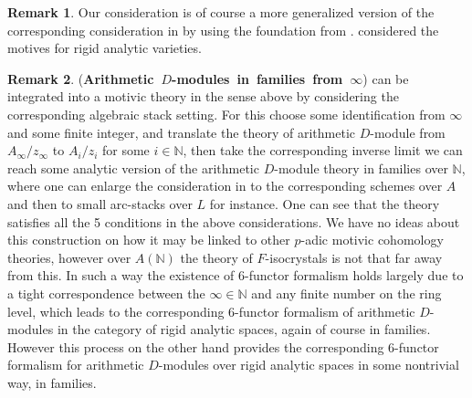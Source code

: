 \documentclass[12pt]{article}
\theoremstyle{definition}
\newtheorem{remark}{Remark}
\begin{document}
\begin{remark}
Our consideration is of course a more generalized version of the corresponding consideration in \cite{3A} by using the foundation from \cite{3S}. \cite{3A} considered the motives for rigid analytic varieties.
\end{remark}

\begin{remark}\mbox{(\textbf{Arithmetic $D$-modules in families from $\infty$})}
\cite{3A1} can be integrated into a motivic theory in the sense above by considering the corresponding algebraic stack setting. For this choose some identification from $\infty$ and some finite integer, and translate the theory of arithmetic $D$-module from $A_\infty/z_\infty$ to $A_i/z_i$ for some $i \in \mathbb{N}$, then take the corresponding inverse limit we can reach some analytic version of the arithmetic $D$-module theory in families over $\mathbb{N}$, where one can enlarge the consideration in \cite{3A} to the corresponding schemes over $A$ and then to small arc-stacks over $L$ for instance. One can see that the theory satisfies all the 5 conditions in the above considerations. We have no ideas about this construction on how it may be linked to other $p$-adic motivic cohomology theories, however over $A(\mathbb{N})$ the theory of $F$-isocrystals is not that far away from this. In such a way the existence of 6-functor formalism holds largely due to a tight correspondence between the $\infty\in \mathbb{N}$ and any finite number on the ring level, which leads to the corresponding 6-functor formalism of arithmetic $D$-modules in the category of rigid analytic spaces, again of course in families. However this process on the other hand provides the corresponding 6-functor formalism for arithmetic $D$-modules over rigid analytic spaces in some nontrivial way, in families.
\end{remark}
\end{document}
